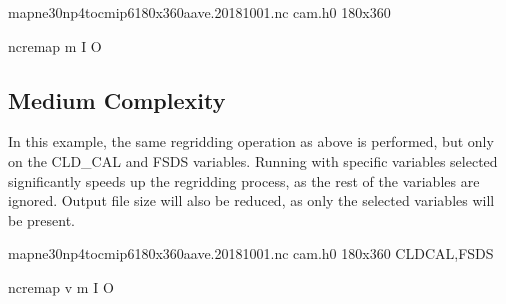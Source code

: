 \documentclass[letterpaper,10pt,english]{sphinxmanual}
\begin{document}
\begin{sphinxVerbatim}[commandchars=\\\{\}]
map\PYGZus{}ne30np4\PYGZus{}to\PYGZus{}cmip6\PYGZus{}180x360\PYGZus{}aave.20181001.nc    
cam.h0                                            
180x360                                          

ncremap \PYGZhy{}m  \PYGZhy{}I  \PYGZhy{}O 
\end{sphinxVerbatim}


\subsection{Medium Complexity}
\label{\detokenize{atm_regrid:medium-complexity}}
In this example, the same regridding operation as above is performed, but only on the CLD\_CAL and FSDS variables.
Running with specific variables selected significantly speeds up the regridding process, as the rest of the variables are ignored.
Output file size will also be reduced, as only the selected variables will be present.

\begin{sphinxVerbatim}[commandchars=\\\{\}]
map\PYGZus{}ne30np4\PYGZus{}to\PYGZus{}cmip6\PYGZus{}180x360\PYGZus{}aave.20181001.nc   
cam.h0                                           
180x360                                         
CLD\PYGZus{}CAL,FSDS                                       

ncremap \PYGZhy{}v  \PYGZhy{}m  \PYGZhy{}I  \PYGZhy{}O 
\end{sphinxVerbatim}
\end{document}
